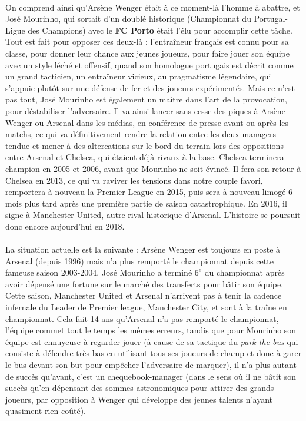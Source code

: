 \documentclass[14pt, openany]{article}
\begin{document}
\paragraph{}
On comprend ainsi qu'Arsène Wenger était à ce moment-là l'homme à abattre, et José Mourinho, qui sortait d'un doublé historique (Championnat du Portugal-Ligue des Champions) avec le \textbf{FC Porto} était l'élu pour accomplir cette tâche. Tout est fait pour opposer ces deux-là : l'entraîneur français est connu pour sa classe, pour donner leur chance aux jeunes joueurs, pour faire jouer son équipe avec un style \og léché \fg{} et offensif, quand son homologue portugais est décrit comme un grand tacticien, un entraîneur vicieux, au pragmatisme légendaire, qui s'appuie plutôt sur une défense de fer et des joueurs expérimentés. Mais ce n'est pas tout, José Mourinho est également un maître dans l'art de la provocation, pour déstabiliser l'adversaire. Il va ainsi lancer sans cesse des piques à Arsène Wenger ou Arsenal dans les médias, en conférence de presse avant ou après les matchs, ce qui va définitivement rendre la relation entre les deux managers tendue et mener à des altercations sur le bord du terrain lors des oppositions entre Arsenal et Chelsea, qui étaient déjà rivaux à la base. Chelsea terminera champion en 2005 et 2006, avant que Mourinho ne soit évincé. Il fera son retour à Chelsea en 2013, ce qui va raviver les tensions dans notre couple favori, remportera à nouveau la Premier League en 2015, puis sera à nouveau limogé 6 mois plus tard après une première partie de saison catastrophique. En 2016, il signe à Manchester United, autre rival historique d'Arsenal. L'histoire se poursuit donc encore aujourd'hui en 2018.
\paragraph{}
La situation actuelle est la suivante : Arsène Wenger est toujours en poste à Arsenal (depuis 1996) mais n'a plus remporté le championnat depuis cette fameuse saison 2003-2004. José Mourinho a terminé $6^{e}$ du championnat après avoir dépensé une fortune sur le marché des transferts pour bâtir son équipe. Cette saison, Manchester United et Arsenal n'arrivent pas à tenir la cadence infernale du Leader de Premier league, Manchester City, et sont à la traîne en championnat. Cela fait 14 ans qu'Arsenal n'a pas remporté le championnat, l'équipe commet tout le temps les mêmes erreurs, tandis que pour Mourinho son équipe est ennuyeuse à regarder jouer (à cause de sa tactique du \og \textit{park the bus} \fg{} qui consiste à défendre très bas en utilisant tous ses joueurs de champ et donc à \og garer le bus \fg{} devant son but pour empêcher l'adversaire de marquer), il n'a plus autant de succès qu'avant, c'est un \og chequebook-manager \fg{} (dans le sens où il ne bâtit son succès qu'en dépensant des sommes astronomiques pour attirer des grands joueurs, par opposition à Wenger qui développe des jeunes talents n'ayant quasiment rien coûté).
\end{document}
